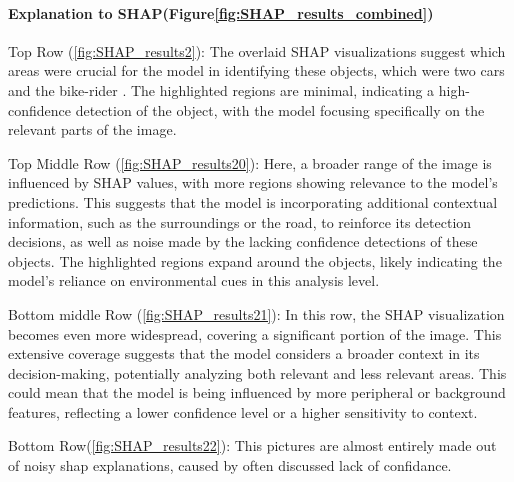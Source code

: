 \paragraph{Explanation to SHAP(Figure\ref{fig:SHAP_results_combined})}


Top Row (\ref{fig:SHAP_results2}): The overlaid SHAP visualizations suggest which areas were crucial for the model in identifying these objects, which were two cars and the bike-rider .
The highlighted regions are minimal, indicating a high-confidence detection of the object, with the model focusing specifically on the relevant parts of the image.

Top Middle Row (\ref{fig:SHAP_results20}): Here, a broader range of the image is influenced by SHAP values, with more regions showing relevance to the model's predictions.
This suggests that the model is incorporating additional contextual information, such as the surroundings or the road, to reinforce its detection decisions, as well as noise made by the lacking confidence detections of these objects.
The highlighted regions expand around the objects, likely indicating the model's reliance on environmental cues in this analysis level.

Bottom middle Row (\ref{fig:SHAP_results21}): In this row, the SHAP visualization becomes even more widespread, covering a significant portion of the image. This extensive coverage suggests that the model considers a broader context in its decision-making, potentially analyzing both relevant and less relevant areas. This could mean that the model is being influenced by more peripheral or background features, reflecting a lower confidence level or a higher sensitivity to context.

Bottom Row(\ref{fig:SHAP_results22}): This pictures are almost entirely made out of noisy shap explanations, caused by often discussed lack of confidance.


